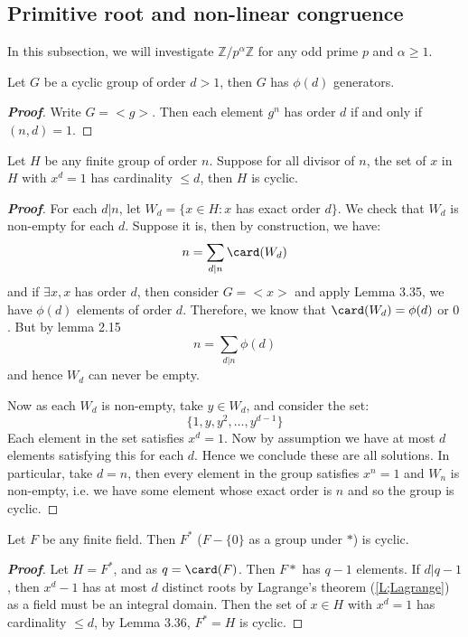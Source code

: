 \subsection{Primitive root and non-linear congruence}
In this subsection, we will investigate $\mathbb{Z}/{p^\alpha \mathbb{Z}}$ for any odd prime $p$ and
$\alpha \ge 1$.
\begin{lemma} Let $G$ be a cyclic group of order $d>1$, then $G$ has $\phi(d)$ generators.
\end{lemma}
\begin{proof}[\bf Proof] Write $G=<g>$. Then each element $g^n$ has order $d$ if and only if $(n,d)=1$.
\end{proof}
\begin{lemma} Let $H$ be any finite group of order $n$. Suppose for all divisor of $n$, the set of $x$ in $H$ with $x^d=1$ has cardinality $\le d$, then $H$ is cyclic.
\end{lemma}
\begin{proof}[\bf Proof] For each $d|n$, let $W_d=\{x \in H: x$ has exact order $d \}$. We check that $W_d$ is non-empty for each $d$. Suppose it is, then by construction, we have:
\begin{equation*} n=\sum_{d|n} \card(W_d) \end{equation*}
and if $\exists x, x$ has order $d$, then consider $G = <x>$ and apply Lemma 3.35, we have $\phi(d)$ elements of order $d$. Therefore, we know that $\card(W_d)=\phi(d)$ or $0$. But by lemma 2.15
\begin{equation*} n=\sum_{d|n}\phi(d) \end{equation*}
and hence $W_d$ can never be empty.

Now as each $W_d$ is non-empty, take $y \in W_d$, and consider the set:
$$ \{1,y,y^2,\ldots, y^{d-1}\} $$
Each element in the set satisfies $x^d=1$. Now by assumption we have at most $d$ elements satisfying this for each $d$. Hence we conclude these are all solutions. In particular, take $d=n$, then every element in the group satisfies $x^n=1$ and $W_n$ is non-empty, i.e. we have some element whose exact order is $n$ and so the group is cyclic.
\end{proof}
\begin{theorem} Let $F$ be any finite field. Then $F^*$ ($F-\{0\}$ as a group under $*$) is cyclic.
\end{theorem}
\begin{proof}[\bf Proof] Let $H=F^*$, and as $q=\card(F)$. Then $F*$ has $q-1$ elements. If $d|q-1$, then $x^d-1$ has at most $d$ distinct roots by Lagrange's theorem (\ref{L;Lagrange}) as a field must be an integral domain. Then the set of $x \in H$ with $x^d=1$ has cardinality $\le d$, by Lemma 3.36, $F^*=H$ is cyclic.
\end{proof}
